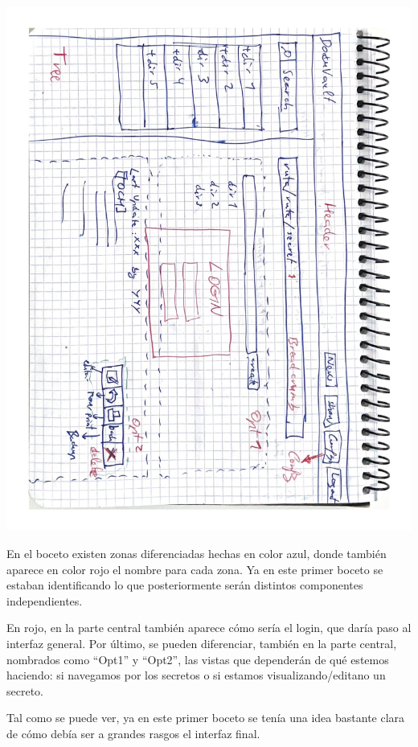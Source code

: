\documentclass{\ClassPath/viu-tfm-template}
\begin{document}
\vspace{-20pt}
\begin{center}
    \includegraphics[angle=90,width=0.9\linewidth]{img/boceto.pdf}
    \vspace{-20pt}
\end{center}

En el boceto existen zonas diferenciadas hechas en color azul, donde también aparece en color rojo el nombre para cada zona. Ya en este primer boceto se estaban identificando lo que posteriormente serán distintos componentes independientes.

En rojo, en la parte central también aparece cómo sería el login, que daría paso al interfaz general. Por último, se pueden diferenciar, también en la parte central, nombrados como “Opt1” y “Opt2”, las vistas que dependerán de qué estemos haciendo: si navegamos por los secretos o si estamos visualizando/editano un secreto.

Tal como se puede ver, ya en este primer boceto se tenía una idea bastante clara de cómo debía ser a grandes rasgos el interfaz final.
\end{document}
